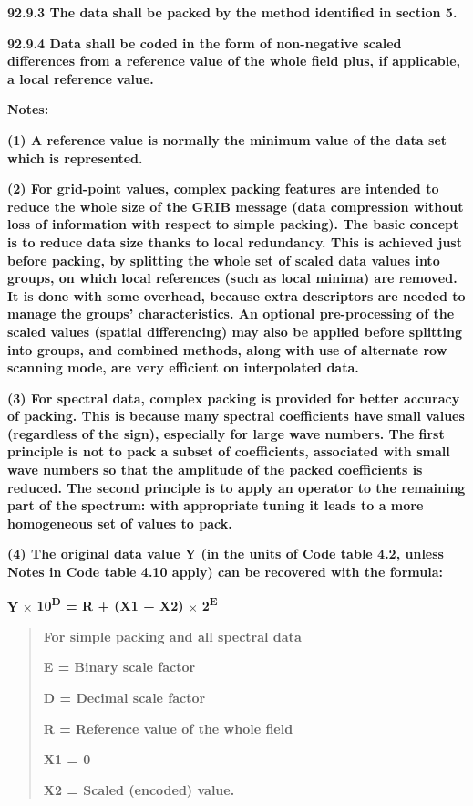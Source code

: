 \textbf{92.9.3 The data shall be packed by the method identified in section 5.}

\textbf{92.9.4 Data shall be coded in the form of non-negative scaled differences from a reference value of the whole field plus, if applicable, a local reference value.}

\textbf{Notes:}

\textbf{(1) A reference value is normally the minimum value of the data set which is represented.}

\textbf{(2) For grid-point values, complex packing features are intended to reduce the whole size of the GRIB message (data compression without loss of information with respect to simple packing). The basic concept is to reduce data size thanks to local redundancy. This is achieved just before packing, by splitting the whole set of scaled data values into groups, on which local references (such as local minima) are removed. It is done with some overhead, because extra descriptors are needed to manage the groups' characteristics. An optional pre-processing of the scaled values (spatial differencing) may also be applied before splitting into groups, and combined methods, along with use of alternate row scanning mode, are very efficient on interpolated data.}

\textbf{(3) For spectral data, complex packing is provided for better accuracy of packing. This is because many spectral coefficients have small values (regardless of the sign), especially for large wave numbers. The first principle is not to pack a subset of coefficients, associated with small wave numbers so that the amplitude of the packed coefficients is reduced. The second principle is to apply an operator to the remaining part of the spectrum: with appropriate tuning it leads to a more homogeneous set of values to pack.}

\textbf{(4) The original data value Y (in the units of Code table 4.2, unless Notes in Code table 4.10 apply) can be recovered with the formula:}

\textbf{Y} × \textbf{10\textsuperscript{D} = R + (X1 + X2)} × \textbf{2\textsuperscript{E}}

\begin{quote}
\textbf{For simple packing and all spectral data}

\textbf{E = Binary scale factor}

\textbf{D = Decimal scale factor}

\textbf{R = Reference value of the whole field}

\textbf{X1 = 0}

\textbf{X2 = Scaled (encoded) value.}
\end{quote}

